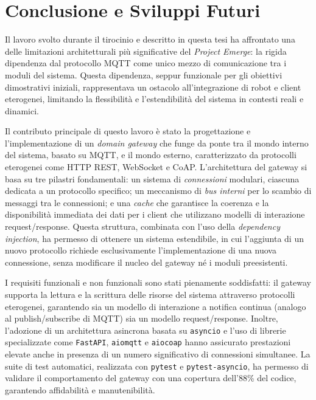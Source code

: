 \chapter{Conclusione e Sviluppi Futuri}
\label{chap:conclusione}

Il lavoro svolto durante il tirocinio e descritto in questa tesi ha affrontato una delle limitazioni architetturali più significative del \textit{Project Emerge}: la rigida dipendenza dal protocollo \ac{MQTT} come unico mezzo di comunicazione tra i moduli del sistema. Questa dipendenza, seppur funzionale per gli obiettivi dimostrativi iniziali, rappresentava un ostacolo all'integrazione di robot e client eterogenei, limitando la flessibilità e l'estendibilità del sistema in contesti reali e dinamici.

Il contributo principale di questo lavoro è stato la progettazione e l'implementazione di un \textit{domain gateway} che funge da ponte tra il mondo interno del sistema, basato su \ac{MQTT}, e il mondo esterno, caratterizzato da protocolli eterogenei come \ac{HTTP} \ac{REST}, WebSocket e \ac{CoAP}. L'architettura del gateway si basa su tre pilastri fondamentali: un sistema di \textit{connessioni} modulari, ciascuna dedicata a un protocollo specifico; un meccanismo di \textit{bus interni} per lo scambio di messaggi tra le connessioni; e una \textit{cache} che garantisce la coerenza e la disponibilità immediata dei dati per i client che utilizzano modelli di interazione request/response. Questa struttura, combinata con l'uso della \textit{dependency injection}, ha permesso di ottenere un sistema estendibile, in cui l'aggiunta di un nuovo protocollo richiede esclusivamente l'implementazione di una nuova connessione, senza modificare il nucleo del gateway né i moduli preesistenti.

I requisiti funzionali e non funzionali sono stati pienamente soddisfatti: il gateway supporta la lettura e la scrittura delle risorse del sistema attraverso protocolli eterogenei, garantendo sia un modello di interazione a notifica continua (analogo al publish/subscribe di \ac{MQTT}) sia un modello request/response. Inoltre, l'adozione di un architettura asincrona basata su \texttt{asyncio} e l'uso di librerie specializzate come \texttt{FastAPI}, \texttt{aiomqtt} e \texttt{aiocoap} hanno assicurato prestazioni elevate anche in presenza di un numero significativo di connessioni simultanee. La suite di test automatici, realizzata con \texttt{pytest} e \texttt{pytest-asyncio}, ha permesso di validare il comportamento del gateway con una copertura dell'88\% del codice, garantendo affidabilità e manutenibilità.

